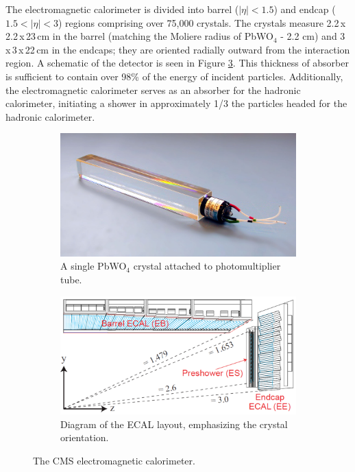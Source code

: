 The electromagnetic calorimeter is divided into barrel ($|\eta|<1.5$) and endcap ($1.5<|\eta|<3$) regions comprising over 75,000 crystals. The crystals measure 2.2$\,$x$\,$2.2$\,$x$\,$23$\,$cm in the barrel (matching the Moliere radius of PbWO$_{4}$ - 2.2 cm) and 3$\,$x$\,$3$\,$x$\,$22$\,$cm in the endcaps; they are oriented radially outward from the interaction region. A schematic of the detector is seen in Figure \ref{fig:ecal}. This thickness of absorber is sufficient to contain over 98\% of the energy of incident particles. Additionally, the electromagnetic calorimeter serves as an absorber for the hadronic calorimeter, initiating a shower in approximately 1/3 the particles headed for the hadronic calorimeter.

\begin{figure}[hb!]
\centering
\begin{subfigure}[b]{0.35\textwidth}
\includegraphics[width=\textwidth]{figs/ecalcrystal.jpg}
\caption{A single PbWO$_{4}$ crystal attached to photomultiplier tube.}
\label{fig:ecalcrystal}
\end{subfigure}
\begin{subfigure}[b]{0.625\textwidth}
\includegraphics[width=\textwidth]{figs/ecal.png}
\caption{Diagram of the ECAL layout, emphasizing the crystal orientation.}
\label{fig:ecal}
\end{subfigure}
\caption{The CMS electromagnetic calorimeter.}
\end{figure}

